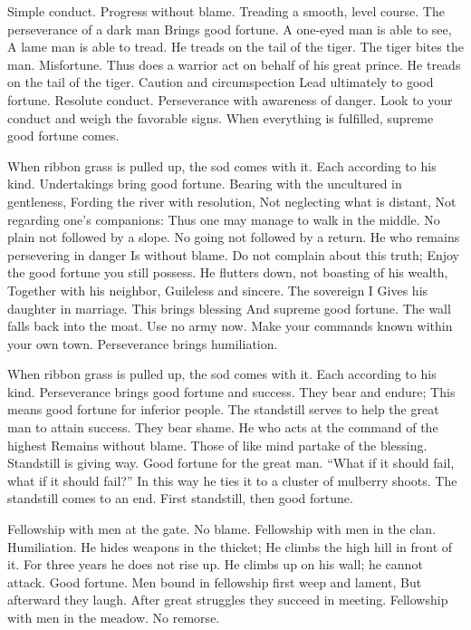 {Simple conduct. Progress without blame.}
{Treading a smooth, level course.
 The perseverance of a dark man
 Brings good fortune.}
{A one-eyed man is able to see,
 A lame man is able to tread.
 He treads on the tail of the tiger.
 The tiger bites the man.
 Misfortune.
 Thus does a warrior act on behalf of his great prince.}
{He treads on the tail of the tiger.
 Caution and circumspection
 Lead ultimately to good fortune.}
{Resolute conduct.
 Perseverance with awareness of danger.}
{Look to your conduct and weigh the favorable signs.
 When everything is fulfilled, supreme good fortune comes.}

{When ribbon grass is pulled up, the sod comes with it.
 Each according to his kind.
 Undertakings bring good fortune.}
{Bearing with the uncultured in gentleness,
 Fording the river with resolution,
 Not neglecting what is distant,
 Not regarding one’s companions:
 Thus one may manage to walk in the middle.}
{No plain not followed by a slope.
 No going not followed by a return.
 He who remains persevering in danger
 Is without blame.
 Do not complain about this truth;
 Enjoy the good fortune you still possess.}
{He flutters down, not boasting of his wealth,
 Together with his neighbor,
 Guileless and sincere.}
{The sovereign I
 Gives his daughter in marriage.
 This brings blessing
 And supreme good fortune.}
{The wall falls back into the moat.
 Use no army now.
 Make your commands known within your own town.
 Perseverance brings humiliation.}

{When ribbon grass is pulled up, the sod comes with it.
 Each according to his kind.
 Perseverance brings good fortune and success.}
{They bear and endure;
 This means good fortune for inferior people.
 The standstill serves to help the great man to attain success.}
{They bear shame.}
{He who acts at the command of the highest
 Remains without blame.
 Those of like mind partake of the blessing.}
{Standstill is giving way.
 Good fortune for the great man.
 “What if it should fail, what if it should fail?”
 In this way he ties it to a cluster of mulberry shoots.}
{The standstill comes to an end.
 First standstill, then good fortune.}

{Fellowship with men at the gate.
 No blame.}
{Fellowship with men in the clan.
 Humiliation.}
{He hides weapons in the thicket;
 He climbs the high hill in front of it.
 For three years he does not rise up.}
{He climbs up on his wall; he cannot attack.
 Good fortune.}
{Men bound in fellowship first weep and lament,
 But afterward they laugh.
 After great struggles they succeed in meeting.}
{%
 Fellowship with men in the meadow.
 No remorse.}

